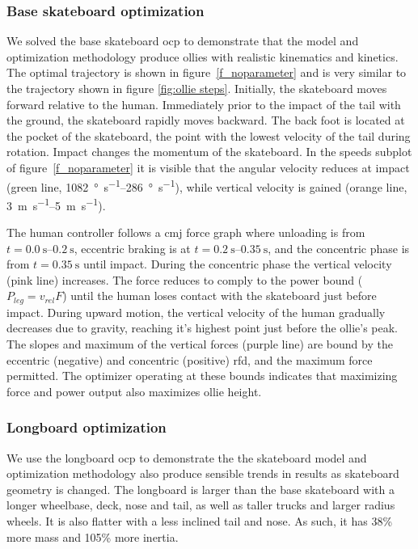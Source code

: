 \documentclass[default,iicol]{sn-jnl}
\begin{document}
\subsubsection{Base skateboard optimization}
We solved the base skateboard \gls{ocp} to demonstrate that the model and optimization methodology produce ollies with realistic kinematics and kinetics.
The optimal trajectory is shown in figure~\ref{f_noparameter} and is very similar to the trajectory shown in figure \ref{fig:ollie steps}.
Initially, the skateboard moves forward relative to the human. Immediately prior to the impact of the tail with the ground, the skateboard rapidly moves backward. 
The back foot is located at the pocket of the skateboard, the point with the lowest velocity of the tail during rotation.
Impact changes the momentum of the skateboard.
In the speeds subplot of figure~\ref{f_noparameter} it is visible that the angular velocity reduces at impact (green line, \SIrange{1082}{286}{\degree\per\second}), while vertical velocity is gained (orange line, \SIrange{3}{5}{\meter\per\second}).

The human controller follows a \gls{cmj} force graph where unloading is from $t=\SIrange{0.0}{0.2}{\second}$, eccentric braking is at $t=\SIrange{0.2}{0.35}{\second}$, and the concentric phase is from $t=\SI{0.35}{\second}$ until impact.
During the concentric phase the vertical velocity (pink line) increases.
The force reduces to comply to the power bound ($P_{leg} = v_{rel} F$) until the human loses contact with the skateboard just before impact.
During upward motion, the vertical velocity of the human gradually decreases due to gravity, reaching it's highest point just before the ollie's peak.
The slopes and maximum of the vertical forces (purple line) are bound by the eccentric (negative) and concentric (positive) \gls{rfd}, and the maximum force permitted.
The optimizer operating at these bounds indicates that maximizing force and power output also maximizes ollie height.

\subsubsection{Longboard optimization}

We use the longboard \gls{ocp} to demonstrate the the skateboard model and optimization methodology also produce sensible trends in results as skateboard geometry is changed. The longboard is larger than the base skateboard with a longer wheelbase, deck, nose and tail, as well as taller trucks and larger radius wheels. It is also flatter with a less inclined tail and nose. As such, it has 38\% more mass and 105\% more inertia.
\end{document}
